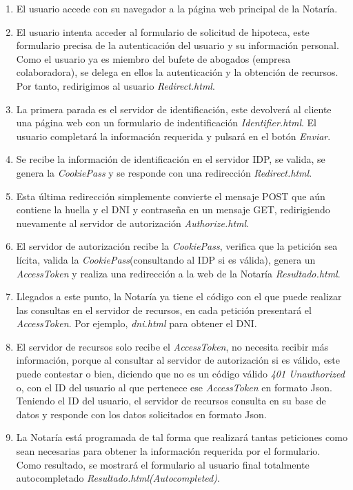 \documentclass[a4,12pt,onecolum]{article}
\begin{document}
\begin{enumerate}
	\item El usuario accede con su navegador a la página web principal de la Notaría.

	\item El usuario intenta acceder al formulario de solicitud de hipoteca, este formulario precisa de la 			autenticación del usuario y su información personal. Como el usuario ya es miembro del bufete de abogados 		(empresa colaboradora), se delega en ellos la autenticación y la obtención de recursos. Por tanto, 				redirigimos al usuario	\emph{Redirect.html}.

	\item La primera parada es el servidor de identificación, este devolverá al cliente una página web con un 		formulario de indentificación \emph{Identifier.html}. El usuario completará la información requerida y 			pulsará en el botón \emph{Enviar}.

	\item Se recibe la información de identificación en el servidor IDP, se valida, se genera la 					\emph{CookiePass} y se responde con una redirección \emph{Redirect.html}.

	\item Esta última redirección simplemente convierte el mensaje POST que aún contiene la huella y el DNI y 		contraseña en un mensaje GET, redirigiendo nuevamente al servidor de autorización \emph{Authorize.html}.

	\item El servidor de autorización recibe la \emph{CookiePass}, verifica que la petición sea lícita, valida 		la \emph{CookiePass}(consultando al IDP si es válida), genera un \emph{AccessToken} y realiza una 				redirección a la web de la Notaría \emph{Resultado.html}.

	\item Llegados a este punto, la Notaría ya tiene el código con el que puede realizar las consultas en el 		servidor de recursos, en cada petición presentará el \emph{AccessToken}. Por ejemplo, \emph{dni.html} para 		obtener el DNI.

	\item El servidor de recursos solo recibe el \emph{AccessToken}, no necesita recibir más información, 			porque al consultar al servidor de autorización si es válido, este puede contestar o bien, diciendo que no 		es un código válido \emph{401 Unauthorized} o, con el ID del usuario al que pertenece ese 						\emph{AccessToken} en formato Json. Teniendo el ID del usuario, el servidor de recursos consulta en su base 	de datos y responde con los datos solicitados en formato Json.

	\item La Notaría está programada de tal forma que realizará tantas peticiones como sean necesarias para 		obtener la información requerida por el formulario. Como resultado, se mostrará el formulario al usuario 		final totalmente autocompletado \emph{Resultado.html(Autocompleted)}.


\end{enumerate}
\end{document}
